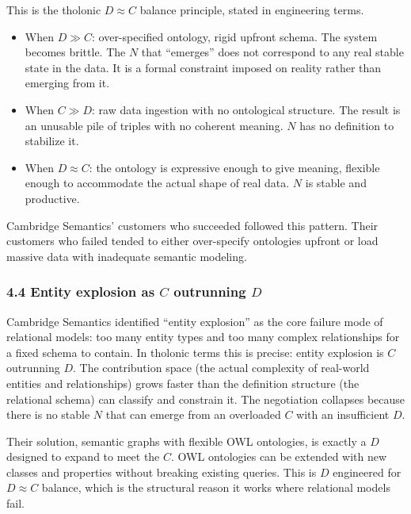 \documentclass[12pt]{article}
\providecommand{\tightlist}{%
  \setlength{\itemsep}{0pt}\setlength{\parskip}{0pt}}
\begin{document}
This is the tholonic \(D \approx C\) balance principle, stated in
engineering terms.

\begin{itemize}
\tightlist
\item
  When \(D \gg C\): over-specified ontology, rigid upfront schema. The
  system becomes brittle. The \(N\) that ``emerges'' does not correspond
  to any real stable state in the data. It is a formal constraint
  imposed on reality rather than emerging from it.
\item
  When \(C \gg D\): raw data ingestion with no ontological structure.
  The result is an unusable pile of triples with no coherent meaning.
  \(N\) has no definition to stabilize it.
\item
  When \(D \approx C\): the ontology is expressive enough to give
  meaning, flexible enough to accommodate the actual shape of real data.
  \(N\) is stable and productive.
\end{itemize}

Cambridge Semantics' customers who succeeded followed this pattern.
Their customers who failed tended to either over-specify ontologies
upfront or load massive data with inadequate semantic modeling.

\subsubsection{\texorpdfstring{4.4 Entity explosion as \(C\) outrunning
\(D\)}{4.4 Entity explosion as C outrunning D}}\label{entity-explosion-as-c-outrunning-d}

Cambridge Semantics identified ``entity explosion'' as the core failure
mode of relational models: too many entity types and too many complex
relationships for a fixed schema to contain. In tholonic terms this is
precise: entity explosion is \(C\) outrunning \(D\). The contribution
space (the actual complexity of real-world entities and relationships)
grows faster than the definition structure (the relational schema) can
classify and constrain it. The negotiation collapses because there is no
stable \(N\) that can emerge from an overloaded \(C\) with an
insufficient \(D\).

Their solution, semantic graphs with flexible OWL ontologies, is exactly
a \(D\) designed to expand to meet the \(C\). OWL ontologies can be
extended with new classes and properties without breaking existing
queries. This is \(D\) engineered for \(D \approx C\) balance, which is
the structural reason it works where relational models fail.
\end{document}
